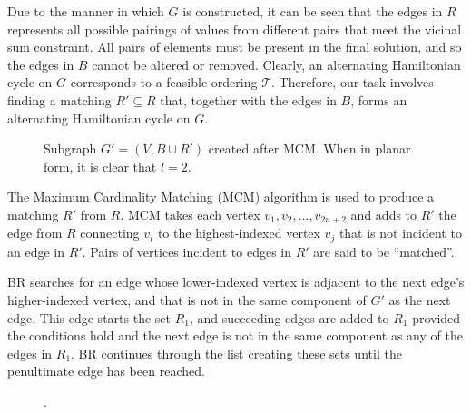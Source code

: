 \documentclass{elsarticle}
\begin{document}
Due to the manner in which $G$ is constructed, it can be seen that the edges in $R$ represents all possible pairings of values from different pairs that meet the vicinal sum constraint. All pairs of elements must be present in the final solution, and so the edges in $B$ cannot be altered or removed. Clearly, an alternating Hamiltonian cycle on $G$ corresponds to a feasible ordering $\mathcal{T}$. Therefore, our task involves finding a matching $R' \subseteq R$ that, together with the edges in $B$, forms an alternating Hamiltonian cycle on $G$.

\begin{figure}[H]	
	\centering
	\begin{subfigure}[h]{0.35\textwidth}
		
	\end{subfigure}
	\begin{subfigure}[h]{0.3\textwidth}
		
	\end{subfigure}
	\begin{subfigure}[h]{0.3\textwidth}
		
	\end{subfigure}
	\caption{Subgraph $G'= (V, B \cup R')$ created after MCM. When in planar form, it is clear that $l = 2$.}
	\label{fig:mps}
\end{figure}

The Maximum Cardinality Matching (MCM) algorithm is used to produce a matching $R'$ from $R$. MCM takes each vertex $v_1, v_2,...,v_{2n+2}$ and adds to $R'$ the edge from $R$ connecting $v_i$ to the highest-indexed vertex $v_j$ that is not incident to an edge in $R'$. Pairs of vertices incident to edges in $R'$ are said to be ``matched''.

BR searches for an edge whose lower-indexed vertex is adjacent to the next edge's higher-indexed vertex, and that is not in the same component of $G'$ as the next edge. This edge starts the set $R_1$, and succeeding edges are added to $R_1$ provided the conditions hold and the next edge is not in the same component as any of the edges in $R_1$. BR continues through the list creating these sets until the penultimate edge has been reached. 

\begin{figure}[H]	
	\centering
	\begin{subfigure}[h]{0.3\textwidth}
		
	\end{subfigure} \hspace{15mm} %
	\begin{subfigure}[h]{0.3\textwidth}
		
	\end{subfigure}
	\caption{.}
	\label{fig:mpsconnect}
\end{figure}
\end{document}
